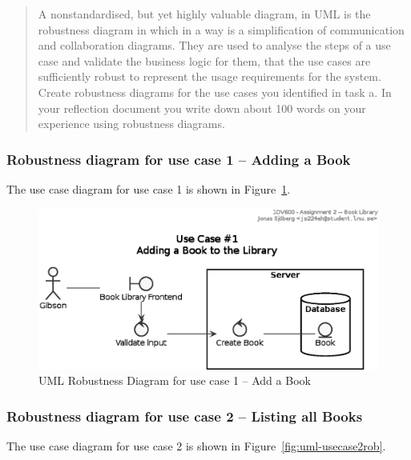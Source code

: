 \begin{quote}
  A non­standardised, but yet highly valuable diagram, in UML is the robustness
  diagram in which in a way is a simplification of communication and
  collaboration diagrams. They are used to analyse the steps of a use case and
  validate the business logic for them, that the use cases are sufficiently
  robust to represent the usage requirements for the system.  Create robustness
  diagrams for the use cases you identified in task a. In your reflection
  document you write down about 100 words on your experience using robustness
  diagrams.
\end{quote}


\subsubsection{Robustness diagram for use case 1 -- Adding a Book}\label{task-1b-robust1}
The use case diagram for use case 1 is shown in Figure~\ref{fig:uml-usecase1rob}.

\begin{figure}[htbp]
  \centering
  \includegraphics[width=0.75\linewidth]{include/uml-use-case-1-rob.eps}
  \caption{UML Robustness Diagram for use case 1 -- Add a Book}
  \label{fig:uml-usecase1rob}
\end{figure}



\subsubsection{Robustness diagram for use case 2 -- Listing all Books}\label{task-1b-robust2}
The use case diagram for use case 2 is shown in Figure~\ref{fig:uml-usecase2rob}.

